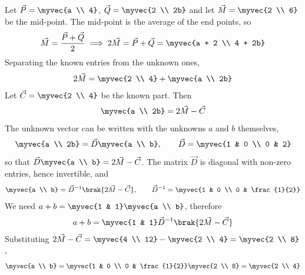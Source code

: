 \begin{enumerate}[label=\thesubsection.\arabic*, ref=\thesubsection.\theenumi]
\solution
Let $\vec{P} = \myvec{a \\ 4}$, $\vec{Q} = \myvec{2 \\ 2b}$ and let $\vec{M} = \myvec{2 \\ 6}$ be the mid-point. The mid-point is the average of the end points, so
\begin{align}
	\vec{M} = \frac{\vec{P} + \vec{Q}}{2} \implies 2\vec{M} = \vec{P} + \vec{Q} = \myvec{a + 2 \\ 4 + 2b}
\end{align}
Separating the known entries from the unknown ones,
\begin{align}
	2\vec{M} = \myvec{2 \\ 4} + \myvec{a \\ 2b}
\end{align}
Let $\vec{C} = \myvec{2 \\ 4}$ be the known part. Then
\begin{align}
	\myvec{a \\ 2b} = 2\vec{M} - \vec{C}
\end{align}
The unknown vector can be written with the unknowns $a$ and $b$ themselves,
\begin{align}
	\myvec{a \\ 2b} = \vec{D}\myvec{a \\ b}, \qquad \vec{D} = \myvec{1 & 0 \\ 0 & 2}
\end{align}
so that $\vec{D}\myvec{a \\ b} = 2\vec{M} - \vec{C}$. The matrix $\vec{D}$ is diagonal with non-zero entries, hence invertible, and
\begin{align}
	\myvec{a \\ b} = \vec{D}^{-1}\brak{2\vec{M} - \vec{C}}, \qquad \vec{D}^{-1} = \myvec{1 & 0 \\ 0 & \frac{1}{2}}
\end{align}
We need $a + b = \myvec{1 & 1}\myvec{a \\ b}$, therefore
\begin{align}
	a + b = \myvec{1 & 1}\vec{D}^{-1}\brak{2\vec{M} - \vec{C}}
\end{align}
Substituting $2\vec{M} - \vec{C} = \myvec{4 \\ 12} - \myvec{2 \\ 4} = \myvec{2 \\ 8}$,
\begin{align}
	\myvec{a \\ b} = \myvec{1 & 0 \\ 0 & \frac{1}{2}}\myvec{2 \\ 8} = \myvec{2 \\ 4}

\end{align}
\end{enumerate}

